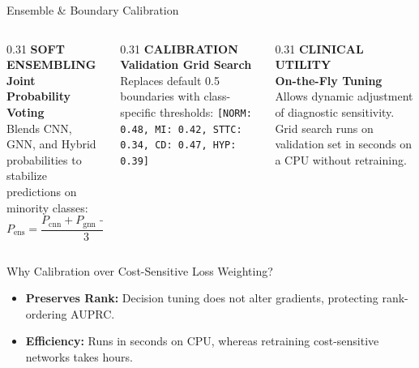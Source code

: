 \documentclass[11pt,aspectratio=169]{beamer}
\begin{document}
\begin{frame}{Ensemble \& Boundary Calibration}
    \begin{columns}[T]
        \begin{column}{0.31\textwidth}
            {\color{rust}\fontsize{7}{9}\selectfont\sffamily\bfseries SOFT ENSEMBLING}\\[0.1cm]
            {\color{slate}\rmfamily\bfseries Joint Probability Voting}\\[0.15cm]
            \fontsize{8}{10}\selectfont Blends CNN, GNN, and Hybrid probabilities to stabilize predictions on minority classes:
            \[ P_{\text{ens}} = \frac{P_{\text{cnn}} + P_{\text{gnn}} + P_{\text{hyb}}}{3} \]
        \end{column}
        \begin{column}{0.31\textwidth}
            {\color{teal}\fontsize{7}{9}\selectfont\sffamily\bfseries CALIBRATION}\\[0.1cm]
            {\color{slate}\rmfamily\bfseries Validation Grid Search}\\[0.15cm]
            \fontsize{8}{10}\selectfont Replaces default 0.5 boundaries with class-specific thresholds:
            \fontsize{7}{9}\selectfont
            \texttt{[NORM: 0.48, MI: 0.42, STTC: 0.34, CD: 0.47, HYP: 0.39]}
        \end{column}
        \begin{column}{0.31\textwidth}
            {\color{rust}\fontsize{7}{9}\selectfont\sffamily\bfseries CLINICAL UTILITY}\\[0.1cm]
            {\color{slate}\rmfamily\bfseries On-the-Fly Tuning}\\[0.15cm]
            \fontsize{8}{10}\selectfont Allows dynamic adjustment of diagnostic sensitivity. Grid search runs on validation set in seconds on a CPU without retraining.
        \end{column}
    \end{columns}
    \vspace{0.3cm}
    \begin{block}{Why Calibration over Cost-Sensitive Loss Weighting?}
        \fontsize{8.5}{10}\selectfont
        \begin{itemize}
            \item \textbf{Preserves Rank:} Decision tuning does not alter gradients, protecting rank-ordering AUPRC.
            \item \textbf{Efficiency:} Runs in seconds on CPU, whereas retraining cost-sensitive networks takes hours.
        \end{itemize}
    \end{block}
\end{frame}
\end{document}
